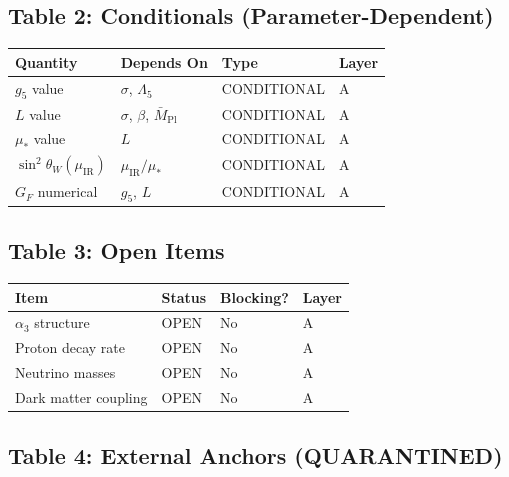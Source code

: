 \documentclass[11pt,a4paper]{article}
\begin{document}
\subsection{Table 2: Conditionals (Parameter-Dependent)}
\label{subsec:table-conditionals}

\begin{canonbox}
\label{box:table-conditionals}
\begin{center}
\begin{tabular}{llll}
\toprule
\textbf{Quantity} & \textbf{Depends On} & \textbf{Type} & \textbf{Layer} \\
\midrule
$g_5$ value & $\sigma$, $\Lambda_5$ & CONDITIONAL & A \\
$L$ value & $\sigma$, $\beta$, $\bar{M}_{\text{Pl}}$ & CONDITIONAL & A \\
$\mu_*$ value & $L$ & CONDITIONAL & A \\
$\sin^2\theta_W(\mu_{\text{IR}})$ & $\mu_{\text{IR}}/\mu_*$ & CONDITIONAL & A \\
$G_F$ numerical & $g_5$, $L$ & CONDITIONAL & A \\
\bottomrule
\end{tabular}
\end{center}
\end{canonbox}

\subsection{Table 3: Open Items}
\label{subsec:table-open}

\begin{canonbox}
\label{box:table-open}
\begin{center}
\begin{tabular}{llll}
\toprule
\textbf{Item} & \textbf{Status} & \textbf{Blocking?} & \textbf{Layer} \\
\midrule
$\alpha_3$ structure & OPEN & No & A \\
Proton decay rate & OPEN & No & A \\
Neutrino masses & OPEN & No & A \\
Dark matter coupling & OPEN & No & A \\
\bottomrule
\end{tabular}
\end{center}
\end{canonbox}

\subsection{Table 4: External Anchors (QUARANTINED)}
\label{subsec:table-external}
\end{document}
